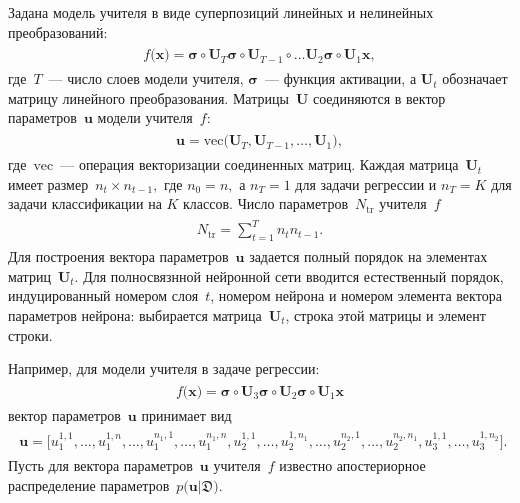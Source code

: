 \documentclass[12pt]{a&t}
\begin{document}
Задана модель учителя в виде суперпозиций линейных и нелинейных преобразований:
\begin{gather}
\label{eq:st:2}
\begin{aligned}
f\bigr(\mathbf{x}\bigr) = \bm{\sigma} \circ \mathbf{U}_T \bm{\sigma} \circ \mathbf{U}_{T-1}\circ \ldots  \mathbf{U}_2\bm{\sigma} \circ \mathbf{U}_1\mathbf{x},
\end{aligned}
\end{gather}
где~$T$~--- число слоев модели учителя, $\bm{\sigma}$~--- функция активации, а $\mathbf{U}_t$ обозначает матрицу линейного преобразования. Матрицы~$\mathbf{U}$ соединяются в вектор параметров~$\mathbf{u}$ модели учителя~$f$:
\begin{gather}
\label{eq:st:2.1}
\begin{aligned}
\mathbf{u} = \text{vec}\bigr(\mathbf{U}_T, \mathbf{U}_{T-1}, \ldots, \mathbf{U}_1\bigr),
\end{aligned}
\end{gather}
где~$\text{vec}$~--- операция векторизации соединенных матриц.
Каждая матрица~$\mathbf{U}_t$ имеет размер~$n_t\times n_{t-1},$ где $n_0=n,$ а  $n_T={1}$ для задачи регрессии и $n_T=K$ для задачи классификации на $K$ классов. Число параметров~$N_{\text{tr}}$ учителя~$f$
\begin{gather}
\label{eq:st:2.2}
\begin{aligned}
N_{\text{tr}} = \sum_{t=1}^{T}n_tn_{t-1}.
\end{aligned}
\end{gather}
Для построения вектора параметров~$\mathbf{u}$ задается полный порядок на элементах матриц~$\mathbf{U}_t$. Для полносвязнной нейронной сети вводится естественный порядок, индуцированный номером слоя~$t$, номером нейрона и номером элемента вектора параметров нейрона: выбирается матрица~$\mathbf{U}_t$, строка этой матрицы и элемент строки.

Например, для модели учителя в задаче регрессии:
\begin{gather}
\label{eq:st:3}
\begin{aligned}
f\bigr(\mathbf{x}\bigr) = \bm{\sigma} \circ \mathbf{U}_3 \bm{\sigma} \circ \mathbf{U}_2\bm{\sigma}\circ \mathbf{U}_1\mathbf{x}
\end{aligned}
\end{gather}
вектор параметров~$\mathbf{u}$ принимает вид
\begin{gather}
\label{eq:st:4}
\begin{aligned}
\mathbf{u} = \bigr[u_1^{1,1}, \ldots, u_1^{1,n},
                                               \ldots, 
                             u_1^{n_1,1}, \ldots, u_1^{n_1,n},  
                             u_2^{1, 1}, \ldots, u_2^{1, n_1}, 
                                                \ldots, 
                            u_2^{n_2, 1}, \ldots, u_2^{n_2, n_1},
                            u_3^{1, 1}, \ldots, u_3^{1, n_2}\bigr].
\end{aligned}
\end{gather}
Пусть для вектора параметров~$\mathbf{u}$ учителя~$f$ известно апостериорное распределение параметров~$p\bigr(\mathbf{u}|\mathfrak{D}\bigr)$.
\end{document}
